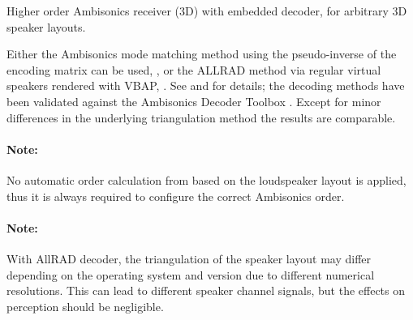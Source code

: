 Higher order Ambisonics receiver (3D) with embedded decoder, for
arbitrary 3D speaker layouts.



Either the Ambisonics mode matching method using the pseudo-inverse of
the encoding matrix can be used, , or the ALLRAD
method via regular virtual speakers rendered with VBAP,
. See \citet{Daniel2001} and
\citet{Heller2012,Heller2014} for details; the decoding methods have
been validated against the Ambisonics Decoder Toolbox
\citep{Heller2014}. Except for minor differences in the underlying
triangulation method the results are comparable.


\paragraph{Note:}
No automatic order calculation from based on the loudspeaker layout is
applied, thus it is always required to configure the correct
Ambisonics order.

\paragraph{Note:} With AllRAD decoder, the triangulation of the speaker layout may differ depending on the operating system and version due to different numerical resolutions. This can lead to different speaker channel signals, but the effects on perception should be negligible.
